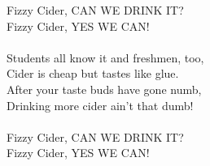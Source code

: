 
Fizzy Cider, CAN WE DRINK IT? \\ Fizzy Cider, YES WE CAN! \\ \hspace{10mm} \\ Students all know it and freshmen, too, \\ Cider is cheap but tastes like glue. \\ After your taste buds have gone numb, \\ Drinking more cider ain't that dumb! \\ \hspace{10mm} \\ Fizzy Cider, CAN WE DRINK IT? \\ Fizzy Cider, YES WE CAN!